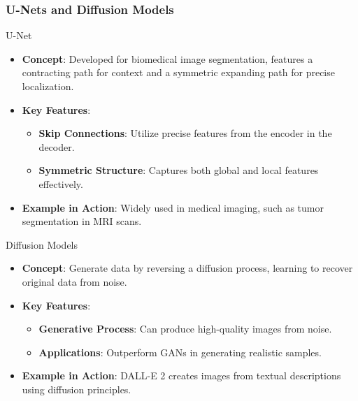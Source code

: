 \documentclass[aspectratio=169]{beamer}
\begin{document}
\begin{frame}[fragile]
    \frametitle{U-Nets and Diffusion Models}
    \begin{block}{U-Net}
        \begin{itemize}
            \item \textbf{Concept}: Developed for biomedical image segmentation, features a contracting path for context and a symmetric expanding path for precise localization.
            \item \textbf{Key Features}:
            \begin{itemize}
                \item \textbf{Skip Connections}: Utilize precise features from the encoder in the decoder.
                \item \textbf{Symmetric Structure}: Captures both global and local features effectively.
            \end{itemize}
            \item \textbf{Example in Action}: Widely used in medical imaging, such as tumor segmentation in MRI scans.
        \end{itemize}
    \end{block}
    
    \begin{block}{Diffusion Models}
        \begin{itemize}
            \item \textbf{Concept}: Generate data by reversing a diffusion process, learning to recover original data from noise.
            \item \textbf{Key Features}:
            \begin{itemize}
                \item \textbf{Generative Process}: Can produce high-quality images from noise.
                \item \textbf{Applications}: Outperform GANs in generating realistic samples.
            \end{itemize}
            \item \textbf{Example in Action}: DALL-E 2 creates images from textual descriptions using diffusion principles.
        \end{itemize}
    \end{block}
\end{frame}
\end{document}
